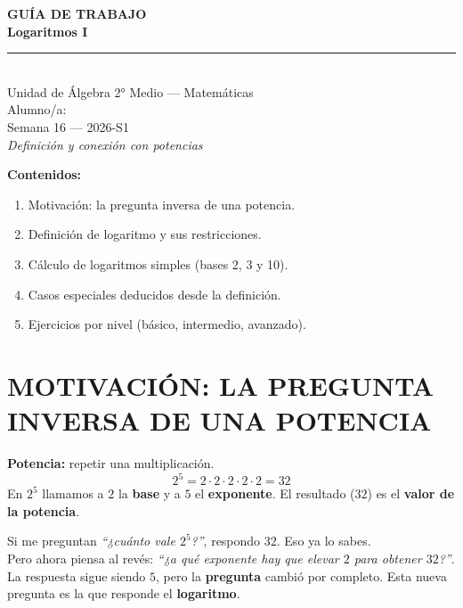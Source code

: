 \documentclass[11pt,a4paper]{article}
\newcommand{\guiaTitulo}{Logaritmos I}
\newcommand{\guiaSubtitulo}{Definición y conexión con potencias}
\newcommand{\guiaUnidad}{Unidad de Álgebra}
\newcommand{\guiaCurso}{2° Medio --- Matemáticas}
\newcommand{\guiaAlumno}{\underline{\hspace{6cm}}}
\newcommand{\guiaSemana}{Semana 16}
\newcommand{\guiaSemestre}{2026-S1}
\begin{document}
\thispagestyle{empty}
\vspace*{3cm}
\begin{center}
  {\Huge\bfseries\color{azulprincipal} GUÍA DE TRABAJO}\\[8pt]
  {\LARGE\bfseries\color{azuloscuro} \guiaTitulo}\\[15pt]
  {\color{azulprincipal}\rule{8cm}{2pt}}\\[15pt]
  {\Large \guiaUnidad{} \textbar{} \guiaCurso}\\[8pt]
  {\large Alumno/a: \guiaAlumno}\\[4pt]
  {\large \guiaSemana{} --- \guiaSemestre}\\[25pt]
  {\itshape\color{gray}
  \guiaSubtitulo}
\end{center}

\vspace{2cm}
\noindent\textbf{Contenidos:}
\begin{enumerate}[leftmargin=2cm]
  \item Motivación: la pregunta inversa de una potencia.
  \item Definición de logaritmo y sus restricciones.
  \item Cálculo de logaritmos simples (bases 2, 3 y 10).
  \item Casos especiales deducidos desde la definición.
  \item Ejercicios por nivel (básico, intermedio, avanzado).
\end{enumerate}
\newpage

\section{MOTIVACIÓN: LA PREGUNTA INVERSA DE UNA POTENCIA}

\begin{tcolorbox}[recuerda]
\textbf{Potencia:} repetir una multiplicación.
\[
  2^5 = 2 \cdot 2 \cdot 2 \cdot 2 \cdot 2 = 32
\]
En $2^5$ llamamos a $2$ la \textbf{base} y a $5$ el \textbf{exponente}. El resultado ($32$) es el \textbf{valor de la potencia}.
\end{tcolorbox}

Si me preguntan \emph{``¿cuánto vale $2^5$?''}, respondo $32$. Eso ya lo sabes.\\[4pt]
Pero ahora piensa al revés: \emph{``¿a qué exponente hay que elevar $2$ para obtener $32$?''}. La respuesta sigue siendo $5$, pero la \textbf{pregunta} cambió por completo. Esta nueva pregunta es la que responde el \textbf{logaritmo}.
\end{document}
